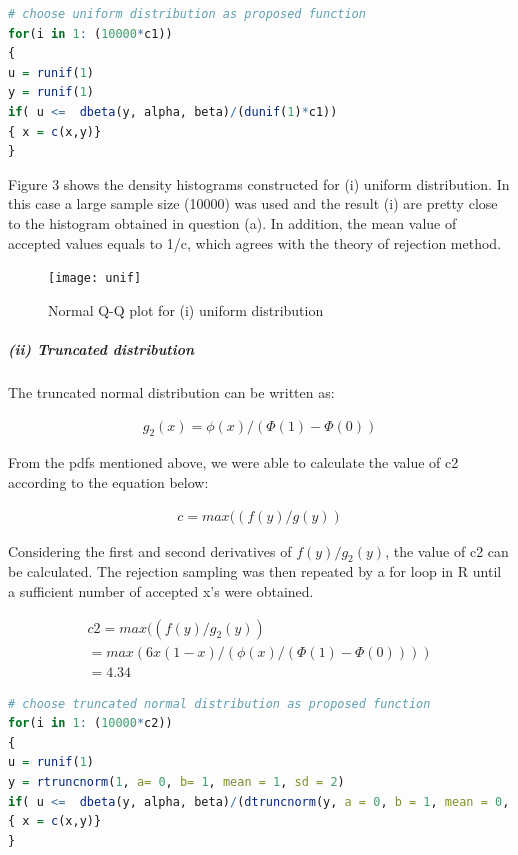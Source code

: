 \documentclass[10pt, letterpaper]{proc}
\begin{document}
\begin{lstlisting}[language=R, breaklines=T, basicstyle=\footnotesize\ttfamily]
# choose uniform distribution as proposed function
for(i in 1: (10000*c1))
{
u = runif(1)
y = runif(1)
if( u <=  dbeta(y, alpha, beta)/(dunif(1)*c1)) 
{ x = c(x,y)}
}
\end{lstlisting}
Figure 3 shows the density histograms constructed for (i) uniform distribution. In this case a large sample size (10000) was used and the result (i) are pretty close to the histogram obtained in question (a). In addition, the mean value of accepted values equals to 1/c, which agrees with the theory of rejection method.

\begin{figure}
	\centering \texttt{[image: unif]}
	\caption{Normal Q-Q plot for (i) uniform distribution}
\end{figure}


\subparagraph{(ii) Truncated distribution}
The truncated normal distribution can be written as:

\begin{equation}
\begin{aligned}
g_2 (x) = \phi(x) /(\Phi (1)- \Phi(0))
\end{aligned}
\end{equation}

From the pdfs mentioned above, we were able to calculate the value of c2 according to the equation below:

\begin{equation}
\begin{aligned}
c = max((f(y)/g(y))
\end{aligned}
\end{equation}

Considering the first and second derivatives of  $f(y)/g_2(y)$, the value of c2 can be calculated. The rejection sampling was then repeated by a for loop in R until a sufficient number of accepted x's were obtained.

\begin{equation}
\begin{aligned}
c2 = max((f(y)/g_2(y))\\ = max(6x(1-x)/(\phi(x) /(\Phi (1)- \Phi(0)))) \\= 4.34
\end{aligned}
\end{equation}

\begin{lstlisting}[language=R, breaklines=T, basicstyle=\footnotesize\ttfamily]
# choose truncated normal distribution as proposed function
for(i in 1: (10000*c2))
{
u = runif(1)
y = rtruncnorm(1, a= 0, b= 1, mean = 1, sd = 2)
if( u <=  dbeta(y, alpha, beta)/(dtruncnorm(y, a = 0, b = 1, mean = 0, sd =1)*c2)) 
{ x = c(x,y)}
}
\end{lstlisting}
\end{document}
